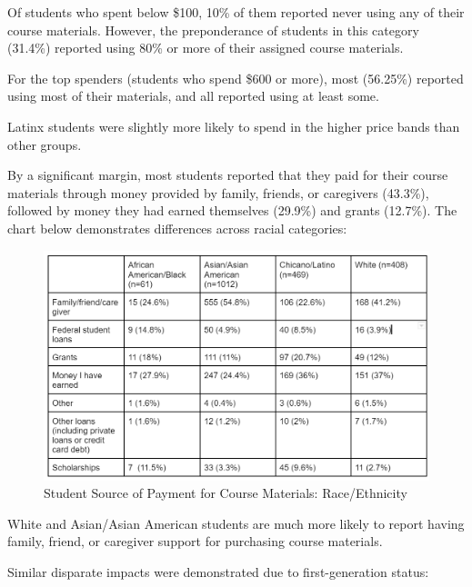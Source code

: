 \documentclass[
  letterpaper,
  DIV=11,
  numbers=noendperiod]{scrreprt}
\begin{document}
Of students who spent below \$100, 10\% of them reported never using any
of their course materials. However, the preponderance of students in
this category (31.4\%) reported using 80\% or more of their assigned
course materials.

For the top spenders (students who spend \$600 or more), most (56.25\%)
reported using most of their materials, and all reported using at least
some.

Latinx students were slightly more likely to spend in the higher price
bands than other groups.

By a significant margin, most students reported that they paid for their
course materials through money provided by family, friends, or
caregivers (43.3\%), followed by money they had earned themselves
(29.9\%) and grants (12.7\%). The chart below demonstrates differences
across racial categories:

\begin{figure}

{\centering \includegraphics{./viz/alfs/AOCM_student_spending.png}

}

\caption{Student Source of Payment for Course Materials: Race/Ethnicity}

\end{figure}

White and Asian/Asian American students are much more likely to report
having family, friend, or caregiver support for purchasing course
materials.

Similar disparate impacts were demonstrated due to first-generation
status:
\end{document}
